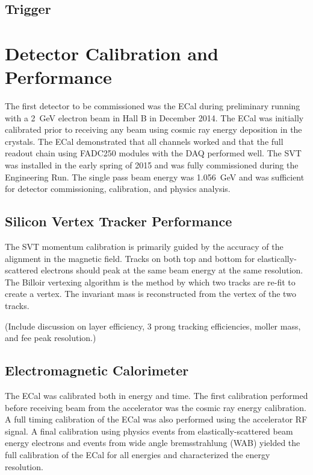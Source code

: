 \documentclass[12pt]{report}
\begin{document}
\section{Trigger}


\chapter{Detector Calibration and Performance} 
The first detector to be commissioned was the ECal during preliminary running with a 2~GeV electron beam in Hall B in December 2014. The ECal was initially calibrated prior to receiving any beam using cosmic ray energy deposition in the crystals. The ECal demonstrated that all channels worked and that the full readout chain using FADC250 modules with the DAQ performed well. The SVT was installed in the early spring of 2015 and was fully commissioned during the Engineering Run. The single pass beam energy was 1.056~GeV and was sufficient for detector commissioning, calibration, and physics analysis. 

\section{Silicon Vertex Tracker Performance}
The SVT momentum calibration is primarily guided by the accuracy of the alignment in the magnetic field. Tracks on both top and bottom for elastically-scattered electrons should peak at the same beam energy at the same resolution. The Billoir vertexing algorithm is the method by which two tracks are re-fit to create a vertex. The invariant mass is reconstructed from the vertex of the two tracks. 

%

(Include discussion on layer efficiency, 3 prong tracking efficiencies, moller mass, and fee peak resolution.)

\section{Electromagnetic Calorimeter}
The ECal was calibrated both in energy and time. The first calibration performed before receiving beam from the accelerator was the cosmic ray energy calibration. A full timing calibration of the ECal was also performed using the accelerator RF signal. A final calibration using physics events from elastically-scattered beam energy electrons and events from wide angle bremsstrahlung (WAB) yielded the full calibration of the ECal for all energies and characterized the energy resolution. 
\end{document}
